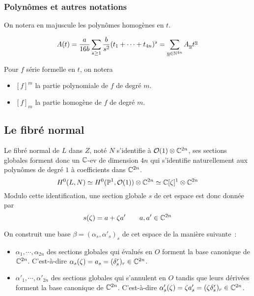 \documentclass[a4paper,11pt,draft,makeidx,twocolumn]{amsart}
\DeclareMathOperator\uu{\underline{u}}
\begin{document}
\subsubsection{Polynômes et autres notations}
On notera en majuscule les polynômes homogènes en $t$.



\begin{equation}
A(t) = \dfrac{a}{16b}\sum_{s \geq 1} \dfrac{b}{s^2}(t_1 + \cdots + t_{4n})^s = \sum_{\uu \in \N^{4n}} A_{\uu} t^{\uu}
\end{equation}

Pour $f$ série formelle en $t$, on notera
\begin{itemize}
\item $\left[f\right]^m$ la partie polynomiale de $f$ de degré $m$.
\item $\left[f\right]_m$ la partie homogène de $f$ de degré $m$.
\end{itemize}


\subsection{Le fibré normal}
Le fibré normal de $L$ dans $Z$, noté $N$ s'identifie à $\mathcal{O}(1) \otimes \mathbb{C}^{2n}$, ses sections globales forment donc un $\mathbb{C}$-ev de dimension $4n$ qui s'identifie naturellement aux polynômes de degré $1$ à coefficients dans $\mathbb{C}^{2n}$.
\begin{equation}
H^0(L,N) \simeq H^0(\mathbb{P}^1, \mathcal{O}(1)) \otimes \mathbb{C}^{2n} \simeq \mathbb{C}[\zeta]^1 \otimes \mathbb{C}^{2n}
\end{equation}
Modulo cette identification, une section globale $s$ de cet espace est donc donnée par
\begin{equation}
s(\zeta) = a + \zeta a' \qquad  a,a' \in \mathbb{C}^{2n}
\end{equation}

On construit une base $\beta = (\alpha_s, \alpha'_s)_s$ de cet espace de la manière suivante~:
\begin{itemize}
\item $\alpha_1, \cdots, \alpha_{2n}$ des sections globales qui évalués en $O$ forment la base canonique de $\mathbb{C}^{2n}$.
C'est-à-dire $\alpha_s(\zeta) = a_s = (\delta_s^r)_r \in \mathbb{C}^{2n}$. 
\item $\alpha'_1, \cdots, \alpha'_{2n}$ des sections globales qui s'annulent en $O$ tandis que leurs dérivées forment la base canonique de $\mathbb{C}^{2n}$.
C'est-à-dire $\alpha'_s(\zeta) = \zeta a'_s = (\zeta \delta_s^r)_r \in \mathbb{C}^{2n}$. 
\end{itemize}
\end{document}
